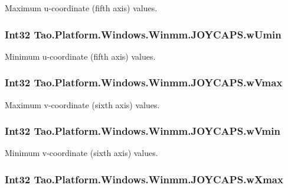 Maximum u-\/coordinate (fifth axis) values. 

\hypertarget{struct_tao_1_1_platform_1_1_windows_1_1_winmm_1_1_j_o_y_c_a_p_s_a0da0d4c01feffc90ac628a2ce15dad59}{
\subsubsection[{wUmin}]{\setlength{\rightskip}{0pt plus 5cm}Int32 {\bf Tao.Platform.Windows.Winmm.JOYCAPS.wUmin}}}
\label{struct_tao_1_1_platform_1_1_windows_1_1_winmm_1_1_j_o_y_c_a_p_s_a0da0d4c01feffc90ac628a2ce15dad59}


Minimum u-\/coordinate (fifth axis) values. 

\hypertarget{struct_tao_1_1_platform_1_1_windows_1_1_winmm_1_1_j_o_y_c_a_p_s_a14588e8381d7f30de70a50bdfa663934}{
\subsubsection[{wVmax}]{\setlength{\rightskip}{0pt plus 5cm}Int32 {\bf Tao.Platform.Windows.Winmm.JOYCAPS.wVmax}}}
\label{struct_tao_1_1_platform_1_1_windows_1_1_winmm_1_1_j_o_y_c_a_p_s_a14588e8381d7f30de70a50bdfa663934}


Maximum v-\/coordinate (sixth axis) values. 

\hypertarget{struct_tao_1_1_platform_1_1_windows_1_1_winmm_1_1_j_o_y_c_a_p_s_a8218e50d9343d5ee3e1422cfd581659d}{
\subsubsection[{wVmin}]{\setlength{\rightskip}{0pt plus 5cm}Int32 {\bf Tao.Platform.Windows.Winmm.JOYCAPS.wVmin}}}
\label{struct_tao_1_1_platform_1_1_windows_1_1_winmm_1_1_j_o_y_c_a_p_s_a8218e50d9343d5ee3e1422cfd581659d}


Minimum v-\/coordinate (sixth axis) values. 

\hypertarget{struct_tao_1_1_platform_1_1_windows_1_1_winmm_1_1_j_o_y_c_a_p_s_aec291d2a403c99427715c896cc115e5c}{
\subsubsection[{wXmax}]{\setlength{\rightskip}{0pt plus 5cm}Int32 {\bf Tao.Platform.Windows.Winmm.JOYCAPS.wXmax}}}
\label{struct_tao_1_1_platform_1_1_windows_1_1_winmm_1_1_j_o_y_c_a_p_s_aec291d2a403c99427715c896cc115e5c}


